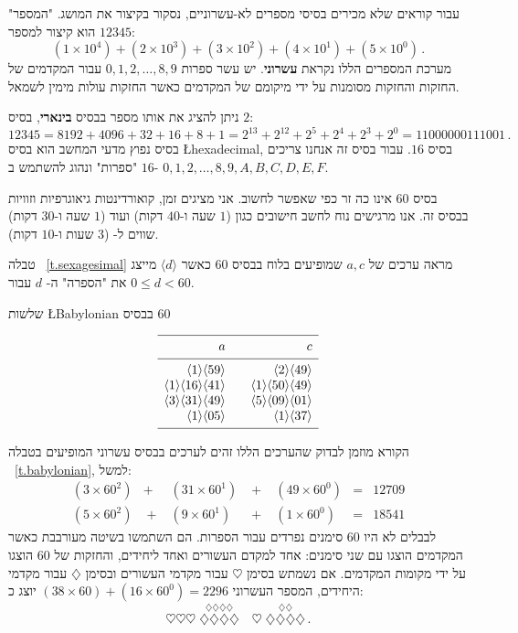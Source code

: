 עבור קוראים שלא מכירים בסיסי מספרים לא-עשרוניים, נסקור בקיצור את המושג. "המספר"
$12345$
הוא קיצור למספר:
\[
(1\times 10^4) + (2\times 10^3) + (3\times 10^2) + (4\times 10^1) + (5\times 10^0)\,.
\]
מערכת המספרים הללו נקראת
\textbf{עשרוני}.
יש עשר ספרות
$0,1,2,\ldots,8,9$
עבור המקדמים של החזקות והחזקות מסומנות על ידי מיקומם של המקדמים כאשר החזקות עולות מימין לשמאל.

ניתן להציג את אותו מספר בבסיס 
\textbf{בינארי}, בסיס 
$2$:
\[
12345=8192 + 4096 + 32+16+8+1=
2^{13} + 2^{12} + 2^{5} + 2^{4} + 2^{3} + 2^0=11000000111001\,.
\]
בסיס נפוץ מדעי המחשב הוא בסיס
\L{hexadecimal},
בסיס
$16$.
עבור בסיס זה אנחנו צריכים 
$16$
"ספרות" ונהוג להשתמש ב-%
$0,1,2,\ldots,8,9,A,B,C,D,E,F$.

בסיס 
$60$
אינו כה זר כפי שאפשר לחשוב. אני מציגים זמן, קואורדינטות גיאוגרפיות וזוויות בבסיס זה. אנו מרגישים נוח לחשב חישובים כגון 
($1$ שעה ו-$40$ דקות) ועוד
($1$ שעה ו-$30$ דקות) שווים ל-%
($3$ שעות ו-$10$ דקות).

טבלה%
~\ref{t.sexagesimal}
מראה ערכים של
$a,c$
שמופיעים בלוח בבסיס
$60$
כאשר 
$\langle d\rangle$
מייצג את "הספרה" ה-%
$d$
עבור
$0\leq d<60$.
\begin{table}[t]
\caption{שלשות \L{Babylonian}
בבסיס
$60$}\label{t.sexagesimal}
\[
\begin{array}{r@{$\quad\quad$}r}
\hline
\noalign{\smallskip}
a&c\\
\noalign{\smallskip}\hline\noalign{\smallskip}
\langle 1\rangle \langle 59 \rangle&\langle 2\rangle \langle 49 \rangle\\
\langle 1\rangle \langle 16 \rangle\langle 41\rangle&\langle 1\rangle \langle 50 \rangle\langle 49\rangle\\
\langle 3\rangle \langle 31 \rangle\langle 49\rangle&\langle 5\rangle \langle 09 \rangle\langle 01\rangle\\
\langle 1\rangle \langle 05 \rangle&\langle 1\rangle \langle 37 \rangle\\
\noalign{\smallskip}\hline
\end{array}
\]
\end{table}
הקורא מוזמן לבדוק שהערכים הללו זהים לערכים בבסיס עשרוני המופיעים בטבלה%
~\ref{t.babylonian},
למשל:
\[
\renewcommand{\arraystretch}{1.3}
\begin{array}{lclclcr}
(3\times 60^2) &+& (31\times 60^1) &\;+\;& (49\times 60^0) &=&   12709\\
(5\times 60^2) &\;+\;& (9\times 60^1) &\;+\;& (1\times 60^0) &=& 18541
\end{array}
\]
לבבלים לא היו
$60$
סימנים נפרדים עבור הספרות. הם השתמשו בשיטה מעורבבת כאשר המקדמים הוצגו עם שני סימנים: אחד למקדם העשורים ואחד ליחידים, והחזקות של $60$ הוצגו על ידי מקומות המקדמים.
אם נשמתש בסימן
$\heartsuit$
עבור מקדמי העשורים ובסימן
$\diamondsuit$ 
עבור מקדמי היחידים, המספר העשרוני
$(38\times 60)+(16\times 60^0)=2296$
יוצג כ:
\[
\heartsuit\heartsuit\heartsuit \; \stackrel{\displaystyle\diamondsuit\diamondsuit\diamondsuit\diamondsuit}{\diamondsuit\diamondsuit\diamondsuit\diamondsuit}
\quad
\heartsuit \; \stackrel{\displaystyle\diamondsuit\diamondsuit}{\diamondsuit\diamondsuit\diamondsuit\diamondsuit}\,.
\]

